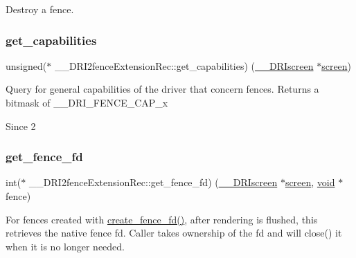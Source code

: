 Destroy a fence. \mbox{\label{struct_____d_r_i2fence_extension_rec_a21aaf599d663afa0f833c9e6221943fc}} 
\subsubsection{\texorpdfstring{get\+\_\+capabilities}{get\_capabilities}}
{\footnotesize\ttfamily unsigned($\ast$ \+\_\+\+\_\+\+D\+R\+I2fence\+Extension\+Rec\+::get\+\_\+capabilities) (\hyperlink{dri__interface_8h_a9961b01d421ee1fd6ed3c05acc9ca561}{\+\_\+\+\_\+\+D\+R\+Iscreen} $\ast$\hyperlink{cad_8h_ae04e09e4e3831bfc1632c509ae37dcec}{screen})}

Query for general capabilities of the driver that concern fences. Returns a bitmask of \+\_\+\+\_\+\+D\+R\+I\+\_\+\+F\+E\+N\+C\+E\+\_\+\+C\+A\+P\+\_\+x

\begin{DoxySince}{Since}
2 
\end{DoxySince}
\mbox{\label{struct_____d_r_i2fence_extension_rec_aeb23e98d96257fcc5e8b4aa67c49a14b}} 
\subsubsection{\texorpdfstring{get\+\_\+fence\+\_\+fd}{get\_fence\_fd}}
{\footnotesize\ttfamily int($\ast$ \+\_\+\+\_\+\+D\+R\+I2fence\+Extension\+Rec\+::get\+\_\+fence\+\_\+fd) (\hyperlink{dri__interface_8h_a9961b01d421ee1fd6ed3c05acc9ca561}{\+\_\+\+\_\+\+D\+R\+Iscreen} $\ast$\hyperlink{cad_8h_ae04e09e4e3831bfc1632c509ae37dcec}{screen}, \hyperlink{_s_d_l__opengles2__gl2ext_8h_ae5d8fa23ad07c48bb609509eae494c95}{void} $\ast$fence)}

For fences created with \hyperlink{struct_____d_r_i2fence_extension_rec_af5d2a292e552237d4a4378807002013b}{create\+\_\+fence\+\_\+fd()}, after rendering is flushed, this retrieves the native fence fd. Caller takes ownership of the fd and will close() it when it is no longer needed.

